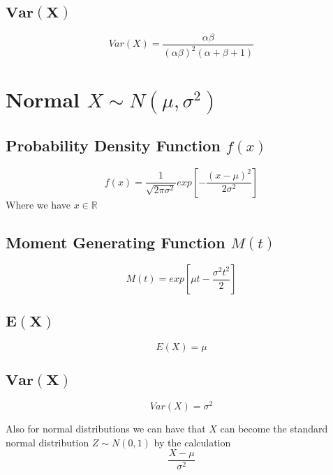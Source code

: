 \documentclass[12pt]{article}
\begin{document}
\subsection{$\bm{Var(X)}$}

\begin{equation*}
  Var(X)= \frac{\alpha \beta}{(\alpha \beta)^{2} (\alpha + \beta + 1)}
\end{equation*}

\newpage
\section{Normal $X \sim N(\mu,\sigma^{2})$}
\subsection{Probability Density Function $f(x)$}

\begin{equation*}
  f(x) = \frac{1}{\sqrt{2\pi \sigma^{2}}}exp \left [- \frac{(x-\mu)^{2}}{2\sigma^{2}}\right]
\end{equation*}
Where we have $x \in \mathbb{R}$

\subsection{Moment Generating Function $M(t)$}
\begin{equation*}
  M(t) = exp \left [\mu t - \frac{\sigma^{2} t^{2}}{2} \right]
\end{equation*}

\subsection{$\bm{E(X)}$}

\begin{equation*}
  E(X) = \mu
\end{equation*}

\subsection{$\bm{Var(X)}$}

\begin{equation*}
  Var(X)= \sigma^{2}
\end{equation*}

Also for normal distributions we can have that $X$ can become the standard normal distribution $Z \sim N(0,1)$ by the calculation
\begin{equation*}
  \frac{X-\mu}{\sigma^{2}}
\end{equation*}
\end{document}

